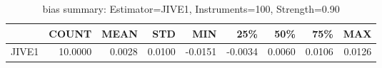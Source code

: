 \begin{table}[ht]
\centering
\caption{bias summary: Estimator=JIVE1, Instruments=100, Strength=0.90}
\begin{tabular}{lrrrrrrrr}
\toprule
 & COUNT & MEAN & STD & MIN & 25\% & 50\% & 75\% & MAX \\
\midrule
JIVE1 & 10.0000 & 0.0028 & 0.0100 & -0.0151 & -0.0034 & 0.0060 & 0.0106 & 0.0126 \\
\bottomrule
\end{tabular}
\end{table}

